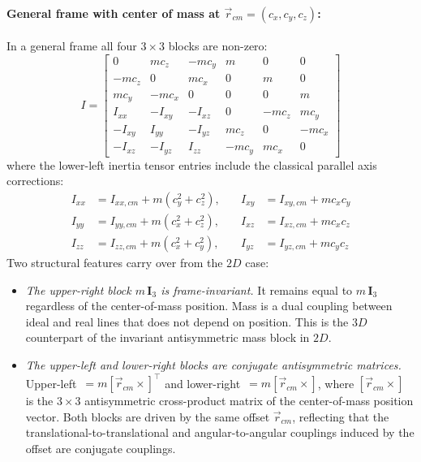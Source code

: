 \paragraph{General frame with center of mass at $\vec{r}_{cm} = (c_x, c_y, c_z)$:} In a
general
frame all four $3\times3$ blocks are non-zero:
\begin{equation}
    I =
    \begin{bmatrix}
        0       &  m c_z   & -m c_y   &  m   &  0     &  0     \\
        -m c_z  &  0       &  m c_x   &  0   &  m     &  0     \\
         m c_y  & -m c_x   &  0       &  0   &  0     &  m     \\
        I_{xx}  & -I_{xy}  & -I_{xz}  &  0   & -m c_z &  m c_y \\
        -I_{xy} &  I_{yy}  & -I_{yz}  &  m c_z &  0   & -m c_x \\
        -I_{xz} & -I_{yz}  &  I_{zz}  & -m c_y &  m c_x &  0
    \end{bmatrix}
    \label{eq:inertia_3D_general}
\end{equation}
where the lower-left inertia tensor entries include the classical parallel axis
corrections:
\begin{align}
    I_{xx} &= I_{xx,cm} + m(c_y^2 + c_z^2), \quad &I_{xy} &
    = I_{xy,cm} + m c_x c_y \nonumber \\
    I_{yy} &= I_{yy,cm} + m(c_x^2 + c_z^2), \quad &I_{xz} &
    = I_{xz,cm} + m c_x c_z \label{eq:parallel_axis_3D} \\
    I_{zz} &= I_{zz,cm} + m(c_x^2 + c_y^2), \quad &I_{yz} &
    = I_{yz,cm} + m c_y c_z \nonumber
\end{align}
Two structural features carry over from the $2D$ case:
\begin{itemize}
    \item \emph{The upper-right block $m\,\mathbf{I}_3$ is frame-invariant.} It remains
    equal to $m\,\mathbf{I}_3$ regardless of the center-of-mass position. Mass is a dual
    coupling between ideal and real lines that does not depend on position. This is the
    $3D$ counterpart of the invariant antisymmetric mass block in $2D$.
    \item \emph{The upper-left and lower-right blocks are conjugate antisymmetric
    matrices.} Upper-left~$= m[\vec{r}_{cm}\times]^\top$ and lower-right~$=
    m[\vec{r}_{cm}\times]$, where $[\vec{r}_{cm}\times]$ is the $3\times3$ antisymmetric
    cross-product matrix of the center-of-mass position vector. Both blocks are driven by
    the same offset $\vec{r}_{cm}$, reflecting that the translational-to-translational and
    angular-to-angular couplings induced by the offset are conjugate couplings.
\end{itemize}

